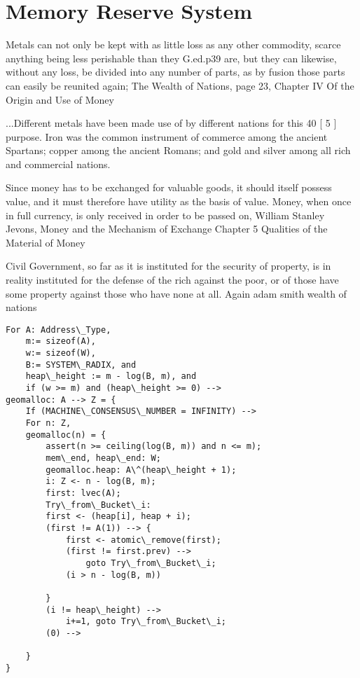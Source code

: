\documentclass[11pt]{book}
\begin{document}
\chapter{Memory Reserve System}

Metals can not only be kept with as little loss
as any other commodity, scarce anything being less perishable than they
G.ed.p39
are, but they can likewise, without any loss, be divided into any number
of parts, as by fusion those parts can easily be reunited again;
The Wealth of Nations, page 23, Chapter IV Of the Origin and Use of Money

...Different metals have been made use of by different nations for this
40
[ 5 ]
purpose. Iron was the common instrument of commerce among the ancient
Spartans; copper among the ancient Romans; and gold and silver among
all rich and commercial nations.

Since money has to be exchanged for valuable goods, it should itself possess value, and it must therefore have utility as the basis of value. Money, when once in full currency, is only received in order to be passed on, 
William Stanley Jevons, Money and the Mechanism of Exchange Chapter 5
Qualities of the Material of Money

Civil Government, so far as it is instituted for the security of property,
is in reality instituted for the defense of the rich against the poor, or
of those have some property against those who have none at all.
Again adam smith wealth of nations

\begin{lstlisting}
For A: Address\_Type,
    m:= sizeof(A),
    w:= sizeof(W), 
    B:= SYSTEM\_RADIX, and
    heap\_height := m - log(B, m), and
    if (w >= m) and (heap\_height >= 0) -->
geomalloc: A --> Z = {    
	If (MACHINE\_CONSENSUS\_NUMBER = INFINITY) -->
	For n: Z,
	geomalloc(n) = {
		assert(n >= ceiling(log(B, m)) and n <= m);
		mem\_end, heap\_end: W;
		geomalloc.heap: A\^(heap\_height + 1);
		i: Z <- n - log(B, m);
		first: lvec(A);
		Try\_from\_Bucket\_i:
		first <- (heap[i], heap + i);
		(first != A(1)) --> {
			first <- atomic\_remove(first);	
			(first != first.prev) -->
				goto Try\_from\_Bucket\_i;
			(i > n - log(B, m))
				
		}
		(i != heap\_height) -->
			i+=1, goto Try\_from\_Bucket\_i;
		(0) -->
			
	}	
}

\end{lstlisting}
\end{document}
